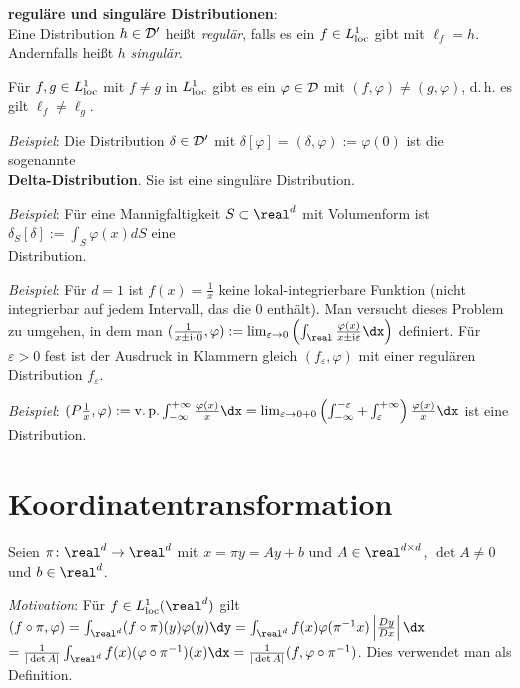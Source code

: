\linie

\textbf{reguläre und singuläre Distributionen}:\\
Eine Distribution $h \in \mathcal{D}'$ heißt \emph{regulär}, falls
es ein $f \in L^1_{{\operatorname{loc}}}$ gibt mit $\ell_f = h$.\\
Andernfalls heißt $h$ \emph{singulär}.

Für $f, g \in L^1_{{\operatorname{loc}}}$ mit $f \not= g$ in $L^1_{{\operatorname{loc}}}$ gibt es ein
$\varphi \in \mathcal{D}$ mit $(f, \varphi) \not= (g, \varphi)$, d.\,h. es gilt
$\ell_f \not= \ell_g$.

\emph{Beispiel}:
Die Distribution $\delta \in \mathcal{D}'$ mit
$\delta[\varphi] = (\delta, \varphi) := \varphi(0)$ ist die sogenannte\\
\textbf{Delta-Distribution}.
Sie ist eine singuläre Distribution.

\emph{Beispiel}:
Für eine Mannigfaltigkeit $S \subset \real^d$ mit Volumenform ist
$\delta_S[\delta] := \int_S \varphi(x) dS$ eine\\
Distribution.

\emph{Beispiel}:
Für $d = 1$ ist $f(x) = \frac{1}{x}$ keine lokal-integrierbare Funktion
(nicht integrierbar auf jedem Intervall, das die $0$ enthält).
Man versucht dieses Problem zu umgehen, in dem man
$(\frac{1}{x \pm \i \cdot 0}, \varphi) :=
\lim_{\varepsilon \to 0} \left(\int_\real
\frac{\varphi(x)}{x \pm \i \varepsilon} \dx\right)$ definiert.
Für $\varepsilon > 0$ fest ist der Ausdruck in Klammern gleich
$(f_\varepsilon, \varphi)$ mit einer regulären Distribution $f_\varepsilon$.

\emph{Beispiel}:
$(P\frac{1}{x}, \varphi) :=
\vp\int_{-\infty}^{+\infty} \frac{\varphi(x)}{x} \dx =
\lim_{\varepsilon \to 0 + 0} \left(\int_{-\infty}^{-\varepsilon} +
\int_\varepsilon^{+\infty}\right) \frac{\varphi(x)}{x} \dx$
ist eine Distribution.

\pagebreak

\section{%
    Koordinatentransformation%
}

Seien $\pi\colon \real^d \rightarrow \real^d$ mit $x = \pi y = Ay + b$
und $A \in \real^{d \times d}$, $\det A \not= 0$ und
$b \in \real^d$.

\emph{Motivation}:
Für $f \in L^1_\loc(\real^d)$ gilt $(f \circ \pi, \varphi) =
\int_{\real^d} (f \circ \pi)(y) \varphi(y) \dy =
\int_{\real^d} f(x) \varphi(\pi^{-1} x) \left|\frac{Dy}{Dx}\right| \dx$\\
$= \frac{1}{|\det A|} \int_{\real^d} f(x) (\varphi \circ \pi^{-1})(x) \dx =
\frac{1}{|\det A|} (f, \varphi \circ \pi^{-1})$.
Dies verwendet man als Definition.

